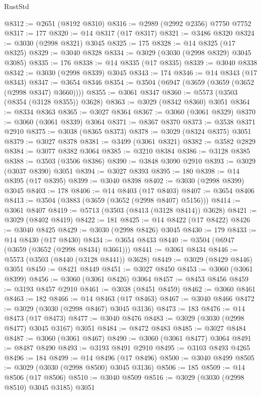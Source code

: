 \begin{lexlean}{RustStd}
\begin{coremodule}
@8312 := @2651 (@8192 @8310)
@8316 := @2989 (@2992 @2356) @7750 @7752
@8317 := 177
@8320 := @14 @8317 (@17 @8317)
@8321 := @3486 @8320
@8324 := @3030 (@2998 @8321) @3045
@8325 := 175
@8328 := @14 @8325 (@17 @8325)
@8329 := @3040 @8328
@8334 := @3029 (@3030 (@2998 @8329) @3045 @3085)
@8335 := 176
@8338 := @14 @8335 (@17 @8335)
@8339 := @3040 @8338
@8342 := @3030 (@2998 @8339) @3045
@8343 := 174
@8346 := @14 @8343 (@17 @8343)
@8347 := @3654 @8346
@8354 := @3504 (@6947 (@3659 (@3659 (@3652 (@2998 @8347) @3660))))
@8355 := @3061 @8347
@8360 := @5573 (@3503 (@8354 (@3128 @8355)) @3628)
@8363 := @3029 (@8342 @8360) @3051
@8364 := @8334 @8363
@8365 := @3027 @8364
@8367 := @3060 (@3061 @8329)
@8370 := @3060 (@3061 @8339) @3064
@8371 := @8367 @8370
@8373 := @3538 @8371 @2910
@8375 := @3038 (@8365 @8373)
@8378 := @3029 (@8324 @8375) @3051
@8379 := @3027 @8378
@8381 := @3499 (@3061 @8321)
@8382 := @3582 @2829
@8384 := @3077 @8382 @3064
@8385 := @3210 @8384
@8386 := @3128 @8385
@8388 := @3503 (@3506 @8386)
@8390 := @3848 @3090 @2910
@8393 := @3029 (@3037 @8390) @3051
@8394 := @3027 @8393
@8395 := 180
@8398 := @14 @8395 (@17 @8395)
@8399 := @3040 @8398
@8402 := @3030 (@2998 @8399) @3045
@8403 := 178
@8406 := @14 @8403 (@17 @8403)
@8407 := @3654 @8406
@8413 := @3504 (@3883 (@3659 (@3652 (@2998 @8407) @5156)))
@8414 := @3061 @8407
@8419 := @5713 (@3503 (@8413 (@3128 @8414)) @3628)
@8421 := @3029 (@8402 @8419)
@8422 := 181
@8425 := @14 @8422 (@17 @8422)
@8426 := @3040 @8425
@8429 := @3030 (@2998 @8426) @3045
@8430 := 179
@8433 := @14 @8430 (@17 @8430)
@8434 := @3654 @8433
@8440 := @3504 (@6947 (@3659 (@3652 (@2998 @8434) @3661)))
@8441 := @3061 @8434
@8446 := @5573 (@3503 (@8440 (@3128 @8441)) @3628)
@8449 := @3029 (@8429 @8446) @3051
@8450 := @8421 @8449
@8451 := @3027 @8450
@8453 := @3060 (@3061 @8399)
@8456 := @3060 (@3061 @8426) @3064
@8457 := @8453 @8456
@8459 := @3193 @8457 @2910
@8461 := @3038 (@8451 @8459)
@8462 := @3060 @8461
@8463 := 182
@8466 := @14 @8463 (@17 @8463)
@8467 := @3040 @8466
@8472 := @3029 (@3030 (@2998 @8467) @3045 @3136)
@8473 := 183
@8476 := @14 @8473 (@17 @8473)
@8477 := @3040 @8476
@8483 := @3029 (@3030 (@2998 @8477) @3045 @3167) @3051
@8484 := @8472 @8483
@8485 := @3027 @8484
@8487 := @3060 (@3061 @8467)
@8490 := @3060 (@3061 @8477) @3064
@8491 := @8487 @8490
@8493 := @3193 @8491 @2910
@8495 := @3103 @8493 @4265
@8496 := 184
@8499 := @14 @8496 (@17 @8496)
@8500 := @3040 @8499
@8505 := @3029 (@3030 (@2998 @8500) @3045 @3136)
@8506 := 185
@8509 := @14 @8506 (@17 @8506)
@8510 := @3040 @8509
@8516 := @3029 (@3030 (@2998 @8510) @3045 @3185) @3051

\end{coremodule}
\end{lexlean}

